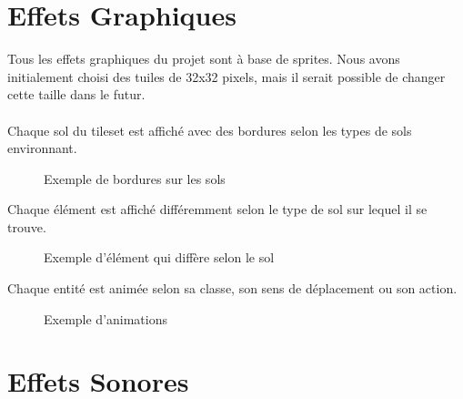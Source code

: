 \documentclass[a4paper]{article}
\newcommand{\alinea}{\hspace*{0.5cm}}
\begin{document}
\newpage
  \part{Effets Graphiques}
	\alinea Tous les effets graphiques du projet sont à base de sprites. Nous avons initialement choisi des tuiles de 32x32 pixels, mais il serait possible de changer cette taille dans le futur.\\
	\\
	\alinea Chaque sol du tileset est affiché avec des bordures selon les types de sols environnant.\\
    \begin{figure}
      \begin{center}
      \end{center}
      \caption{Exemple de bordures sur les sols}
    \end{figure}
	\alinea Chaque élément est affiché différemment selon le type de sol sur lequel il se trouve.\\
    \begin{figure}
      \begin{center}
      \end{center}
      \caption{Exemple d'élément qui diffère selon le sol}
    \end{figure}
    \alinea Chaque entité est animée selon sa classe, son sens de déplacement ou son action.\\
    \begin{figure}
      \begin{center}
      \end{center}
      \caption{Exemple d'animations}
    \end{figure}
      
\newpage
  \part{Effets Sonores}
\end{document}
